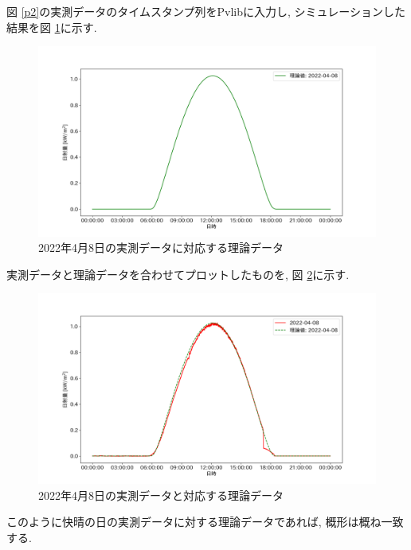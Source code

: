 \documentclass[a4j,12pt,]{jarticle}
\begin{document}
図 \ref{p2}の実測データのタイムスタンプ列をPvlibに入力し, シミュレーションした結果を図 \ref{p3}に示す.

\begin{figure}[H]
  \begin{center}
    \includegraphics[width=160mm]{theoretical.png}
    \caption{2022年4月8日の実測データに対応する理論データ}
    \label{p3}
  \end{center}
\end{figure}

実測データと理論データを合わせてプロットしたものを, 図 \ref{p4}に示す.

\begin{figure}[H]
  \begin{center}
    \includegraphics[width=160mm]{real_and_theoretical.png}
    \caption{2022年4月8日の実測データと対応する理論データ}
    \label{p4}
  \end{center}
\end{figure}

このように快晴の日の実測データに対する理論データであれば, 概形は概ね一致する.
\end{document}
